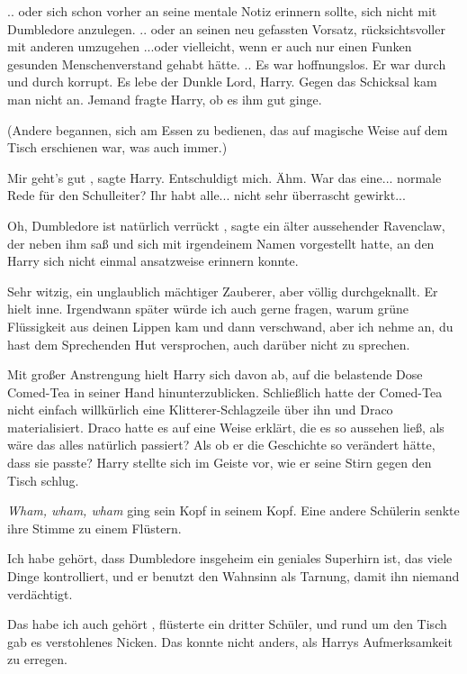 .. oder sich schon vorher an seine mentale Notiz erinnern sollte, sich nicht mit
Dumbledore anzulegen. .. oder an seinen neu gefassten Vorsatz, rücksichtsvoller
mit anderen umzugehen ...oder vielleicht, wenn er auch nur einen Funken gesunden
Menschenverstand gehabt hätte. .. Es war hoffnungslos. Er war durch und durch
korrupt. Es lebe der Dunkle Lord, Harry. Gegen das Schicksal kam man nicht an.
Jemand fragte Harry, ob es ihm gut ginge.

(Andere begannen, sich am Essen zu bedienen, das auf magische Weise auf dem
Tisch erschienen war, was auch immer.)

\glqq Mir geht's gut\grqq{} , sagte Harry. \glqq Entschuldigt mich. Ähm. War das
eine... normale Rede für den Schulleiter? Ihr habt alle... nicht sehr überrascht
gewirkt...\grqq{}

\glqq Oh, Dumbledore ist natürlich verrückt\grqq{} , sagte ein älter aussehender
Ravenclaw, der neben ihm saß und sich mit irgendeinem Namen vorgestellt hatte,
an den Harry sich nicht einmal ansatzweise erinnern konnte.

\glqq Sehr witzig, ein unglaublich mächtiger Zauberer, aber völlig
durchgeknallt.\grqq{} Er hielt inne. \glqq Irgendwann später würde ich auch
gerne fragen, warum grüne Flüssigkeit aus deinen Lippen kam und dann verschwand,
aber ich nehme an, du hast dem Sprechenden Hut versprochen, auch darüber nicht
zu sprechen.\grqq{}

Mit großer Anstrengung hielt Harry sich davon ab, auf die belastende Dose
Comed-Tea in seiner Hand hinunterzublicken. Schließlich hatte der Comed-Tea
nicht einfach willkürlich eine Klitterer-Schlagzeile über ihn und Draco
materialisiert. Draco hatte es auf eine Weise erklärt, die es so aussehen ließ,
als wäre das alles natürlich passiert? Als ob er die Geschichte so verändert
hätte, dass sie passte? Harry stellte sich im Geiste vor, wie er seine Stirn
gegen den Tisch schlug.

\emph{Wham, wham, wham} ging sein Kopf in seinem Kopf. Eine andere Schülerin
senkte ihre Stimme zu einem Flüstern.

\glqq Ich habe gehört, dass Dumbledore insgeheim ein geniales Superhirn ist, das
viele Dinge kontrolliert, und er benutzt den Wahnsinn als Tarnung, damit ihn
niemand verdächtigt.\grqq{}

\glqq Das habe ich auch gehört\grqq{} , flüsterte ein dritter Schüler, und rund
um den Tisch gab es verstohlenes Nicken. Das konnte nicht anders, als Harrys
Aufmerksamkeit zu erregen.

